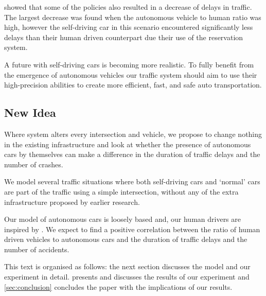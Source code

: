 \textcite{dresner2007sharing} showed that some of the policies also resulted in a decrease of delays in traffic. The largest decrease was found when the autonomous vehicle to human ratio was high, however the self-driving car in this scenario encountered significantly less delays than their human driven counterpart due their use of the reservation system.

A future with self-driving cars is becoming more realistic. To fully benefit from the emergence of autonomous vehicles our traffic system should aim to use their high-precision abilities to create more efficient, fast, and safe auto transportation.


\subsection{New Idea}
\label{sub:intro:new_idea}	
Where \textcite{dresner2007sharing} system alters every intersection and vehicle, we propose to change nothing in the existing infrastructure and look at whether the presence of autonomous cars by themselves can make a difference in the duration of traffic delays and the number of crashes. 

We model several traffic situations where both self-driving cars and `normal' cars are part of the traffic using a simple intersection, without any of the extra infrastructure proposed by earlier research. 


Our model of autonomous cars is loosely based \textcite{jiang2010microscopic} and, our human drivers are inspired by \textcite{paruchuri2002multi}. We expect to find a positive correlation between the ratio of human driven vehicles to autonomous cars and the duration of traffic delays and the number of accidents. 

This text is organised as follows: the next section discusses the model and our experiment in detail.  presents and discusses the results of our experiment and \cref{sec:conclusion} concludes the paper with the implications of our results.